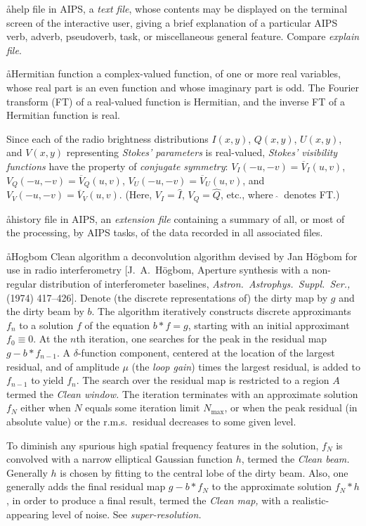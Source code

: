 \aa{help file}
in AIPS, a {\it text file}, whose contents may be displayed
on the terminal screen of the interactive user,
giving a brief explanation of a particular AIPS verb, adverb,
pseudoverb, task, or miscellaneous general feature.
Compare {\it explain file}.

\aa{Hermitian function}
a complex-valued function, of one or more real variables,
whose real part is an even function and whose imaginary part is odd.
The Fourier transform (FT) of a real-valued function is Hermitian,
and the inverse FT of a Hermitian function is real.
\par
Since each of the radio brightness distributions
$I(x,y)$, $Q(x,y)$, $U(x,y)$, and $V(x,y)$
representing {\it Stokes' parameters}
is real-valued,
{\it Stokes' visibility functions} have the property
of {\it conjugate symmetry}\/:
$V_I(-u,-v)=\overline V_I(u,v)$,
$V_Q(-u,-v)=\overline V_Q(u,v)$,
$V_U(-u,-v)=\overline V_U(u,v)$,
and $V_V(-u,-v)=\overline V_V(u,v)$.
(Here, $V_I=\hat I$, $V_Q=\hat Q$, etc., where $\ \hat {}\ $ denotes FT.)

\aa{history file}
in AIPS, an {\it extension file} containing a summary
of all, or most of the processing, by AIPS tasks, of the data recorded
in all associated files.

\aa{Hogbom Clean algorithm}
a deconvolution algorithm
devised by Jan H\"ogbom for use in radio interferometry
[J.~A.~H\"ogbom, Aperture synthesis with a non-regular
distribution of interferometer baselines, {\it Astron.\ Astrophys.\
Suppl.\ Ser.,}  (1974) 417--426].
Denote (the discrete representations of) the dirty map by $g$
and the dirty beam by $b$.
The algorithm iteratively constructs discrete approximants $f_n$
to a solution $f$ of the equation $b\ast f=g$,
starting with an initial approximant $f_0\equiv0$.
At the $n$th iteration, one searches for the peak in the
residual map $g-b\ast f_{n-1}$.
A $\delta$-function component, centered at the location of the largest
residual, and of amplitude $\mu$ (the {\it loop gain}\/)
times the largest residual, is added to $f_{n-1}$ to yield $f_n$.
The search over the residual map is restricted to a region $A$
termed the {\it Clean window.}
The iteration terminates with an approximate solution $f_N$
either when $N$ equals some iteration limit $N_{\operatorname{max}}$,
or when the peak residual (in absolute value) or the r.m.s.\
residual decreases to some given level.
\par
To diminish any spurious high spatial frequency features in
the solution, $f_N$ is convolved with a narrow elliptical Gaussian
function $h$, termed the {\it Clean beam.}
Generally $h$ is chosen by fitting to the central lobe of the
dirty beam.
Also, one generally adds the final residual map $g-b\ast f_N$
to the approximate solution $f_N\ast h$, in order to produce
a final result, termed the {\it Clean map,} with a
realistic-appearing level of noise.
See {\it super-resolution.}

